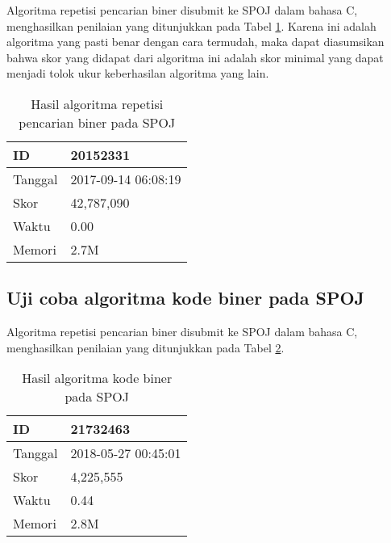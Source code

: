 Algoritma repetisi pencarian biner disubmit ke SPOJ dalam bahasa C, menghasilkan penilaian yang ditunjukkan pada Tabel \ref{tab:score_repetitive}. Karena ini adalah algoritma yang pasti benar dengan cara termudah, maka dapat diasumsikan bahwa skor yang didapat dari algoritma ini adalah skor minimal yang dapat menjadi tolok ukur keberhasilan algoritma yang lain.

\begin{table}[h!]
\caption{Hasil algoritma repetisi pencarian biner pada SPOJ}
\label{tab:score_repetitive}
\begin{center}
\begin{tabular} {|l|l|}
\hline
ID & 20152331 \\ \hline
Tanggal & 2017-09-14 06:08:19 \\ \hline
Skor & 42,787,090 \\ \hline
Waktu & 0.00 \\ \hline
Memori & 2.7M \\ \hline
\end{tabular}
\end{center}
\end{table}

\subsection{Uji coba algoritma kode biner pada SPOJ}

Algoritma repetisi pencarian biner disubmit ke SPOJ dalam bahasa C, menghasilkan penilaian yang ditunjukkan pada Tabel \ref{tab:score_binary_code}.

\begin{table}[h!]
\caption{Hasil algoritma kode biner pada SPOJ}
\label{tab:score_binary_code}
\begin{center}
\begin{tabular} {|l|l|}
\hline
ID & 21732463 \\ \hline
Tanggal & 2018-05-27 00:45:01 \\ \hline
Skor & 4,225,555 \\ \hline
Waktu & 0.44 \\ \hline
Memori & 2.8M \\ \hline
\end{tabular}
\end{center}
\end{table}